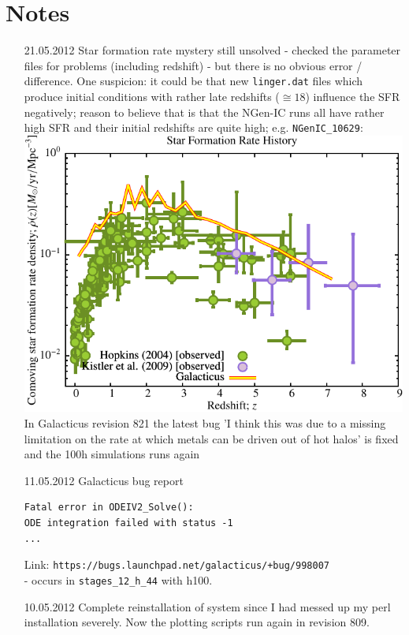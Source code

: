 \chapter{Notes}
\begin{itemize}

\item[21.05.2012]
Star formation rate mystery still unsolved - checked the parameter 
files for problems (including redshift) - but there is no obvious 
error / difference. One suspicion: it could be that new 
\texttt{linger.dat} files 
which produce initial conditions with rather late redshifts ($\cong 18$) 
influence the SFR negatively; reason to believe that is that the 
NGen-IC runs all have rather high SFR and their initial redshifts 
are quite high; e.g. \texttt{NGenIC\_10629}: \\
\includegraphics[scale=0.5]{r256/h100/NGenIC_10629/Plot_Star_Formation_History.pdf}\\
In Galacticus revision 821 the latest bug 'I think this was 
due to a missing limitation on the rate at which metals 
can be driven out of hot halos' is fixed and the 100h 
simulations runs again 


\item[11.05.2012]
Galacticus bug report 
\begin{verbatim}
Fatal error in ODEIV2_Solve():
ODE integration failed with status -1
...
\end{verbatim}
Link: \texttt{https://bugs.launchpad.net/galacticus/+bug/998007} \\ - 
occurs in \texttt{stages\_12\_h\_44} with h100. 

\item[10.05.2012]
Complete reinstallation of system since I had messed up my perl installation 
severely. Now the plotting scripts run again in revision 809. 


\end{itemize}

